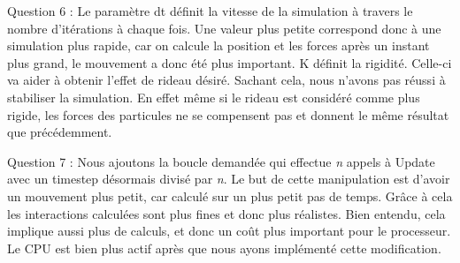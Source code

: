 \documentclass[a4paper,12pt]{article}
\begin{document}
Question 6 : Le paramètre \og{}dt\fg{} définit la vitesse de la simulation à travers le nombre d'itérations à chaque fois. Une valeur plus petite correspond donc à une simulation plus rapide, car on calcule la position et les forces après un instant plus grand, le mouvement a donc été plus important.
K définit la rigidité. Celle-ci va aider à obtenir l'effet de rideau désiré. Sachant cela, nous n'avons pas réussi à stabiliser la simulation. En effet même si le rideau est considéré comme plus rigide, les forces des particules ne se compensent pas et donnent le même résultat que précédemment.

Question 7 : Nous ajoutons la boucle demandée qui effectue \textit{n} appels à \og{}Update\fg{} avec un timestep désormais divisé par \textit{n}. Le but de cette manipulation est d'avoir un mouvement plus petit, car calculé sur un plus petit pas de temps. Grâce à cela les interactions calculées sont plus fines et donc plus réalistes. Bien entendu, cela implique aussi plus de calculs, et donc un coût plus important pour le processeur. Le CPU est bien plus actif après que nous ayons implémenté cette modification. 
\end{document}
